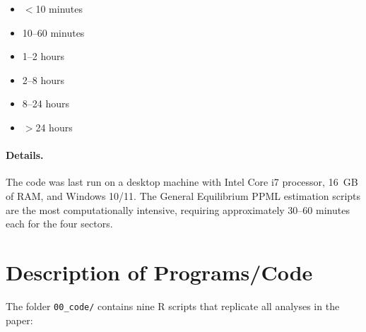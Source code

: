 \documentclass[12pt]{article}
\begin{document}
\begin{itemize}
	\item[$\square$] $<$10 minutes
	\item[$\square$] 10--60 minutes
	\item[$\square$] 1--2 hours
	\item[\rlap{\raisebox{0.3ex}{\hspace{0.4ex}\tiny \ding{52}}}$\square$] 2--8 hours
	\item[$\square$] 8--24 hours
	\item[$\square$] $>$24 hours
\end{itemize}

\paragraph{Details.} The code was last run on a desktop machine with Intel Core i7 processor, 16~GB of RAM, and Windows 10/11. The General Equilibrium PPML estimation scripts are the most computationally intensive, requiring approximately 30--60 minutes each for the four sectors.

\section{Description of Programs/Code}

The folder \texttt{00\_code/} contains nine R scripts that replicate all analyses in the paper:
\end{document}
